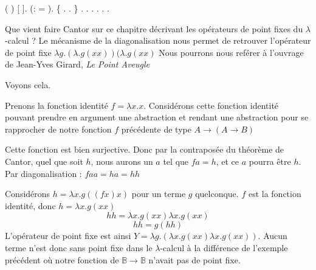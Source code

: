 \documentclass[11pt]{book}
\begin{document}
 \begin{coqdoccode}
\coqdocindent{2.00em}
 ( )  [ ].\coqdoceol
\coqdocindent{2.00em}
 (:   =   ).\coqdoceol
\coqdocindent{2.00em}
\{\coqdoceol
\coqdocindent{4.00em}
 . .\coqdoceol
\coqdocindent{2.00em}
\}\coqdoceol
\coqdocindent{2.00em}
   .\coqdoceol
\coqdocindent{2.00em}
   .\coqdoceol
\coqdocindent{2.00em}
   .\coqdoceol
\coqdocindent{2.00em}
.\coqdoceol
\coqdocnoindent
{}.\coqdoceol
\coqdocemptyline
\coqdocnoindent
{} .\coqdoceol
\end{coqdoccode}

Que vient faire Cantor sur ce chapitre décrivant les opérateurs de point fixes du $\lambda$-calcul ?
Le mécanisme de la diagonalisation nous permet de retrouver l'opérateur de point fixe
 $\lambda g.(\lambda.g(xx))(\lambda.g(xx)$
Nous pourrons nous reférer à l'ouvrage de Jean-Yves Girard, \textit{Le Point Aveugle}
\cite{girard}

Voyons cela.

Prenons la fonction identité $f = \lambda x.x$. Considérons cette fonction identité
pouvant prendre en argument une abstraction et rendant une abstraction pour se rapprocher
de notre fonction $f$ précédente de type $A \rightarrow (A \rightarrow B)$

Cette fonction est bien surjective. Donc par la contraposée du théorème de Cantor, 
quel que soit $h$, nous aurons un $a$ tel que  $f a = h$, et ce $a$ pourra être $h$.
Par diagonalisation : $ f a a = h a = h h $

Considérons $h = \lambda x.g((f x) x)$ pour un terme $g$ quelconque.
$f$ est la fonction identité, donc $h= \lambda x.g(x x)$
$$ h h = \lambda x.g(x x) \lambda x.g(x x)$$
$$ h h = g (h h)$$
L'opérateur de point fixe est ainsi $Y=\lambda g.(\lambda x.g(x x) \lambda x.g(x x))$.
Aucun terme n'est donc sans point fixe dans le $\lambda$-calcul à la différence de l'exemple précédent où notre
fonction de $\mathbb{B} \rightarrow \mathbb{B}$ n'avait pas de point fixe.

\end{document}
